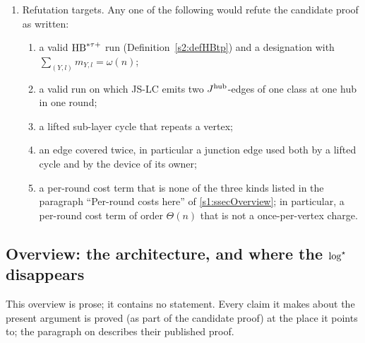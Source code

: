 \begin{remark}
\begin{enumerate}
\item[(v)] Refutation targets. Any one of the following would refute the
candidate proof as written:
\begin{enumerate}
\item[(1)] a valid $\mathrm{HB}^{*\tau{+}}$ run (Definition~\ref{s2:defHBtp}) and a designation
with $\sum_{(Y,l)}m_{Y,l}=\omega(n)$;
\item[(2)] a valid run on which JS-LC emits two $J^{\mathrm{hub}}$-edges of one class at one
hub in one round;
\item[(3)] a lifted sub-layer cycle that repeats a vertex;
\item[(4)] an edge covered twice, in particular a junction edge used both by a
lifted cycle and by the device of its owner;
\item[(5)] a per-round cost term that is none of the three kinds listed in the
paragraph ``Per-round costs here'' of \ref{s1:ssecOverview}; in particular, a
per-round cost term of order $\Theta(n)$ that is not a once-per-vertex charge.
\end{enumerate}
\end{enumerate}
\end{remark}

\subsection*{Overview: the architecture, and where the $\log^{\star}$ disappears}

This overview is prose; it contains no statement. Every claim it makes about the
present argument is proved (as part of the candidate proof) at the place it points
to; the paragraph on \cite{BM} describes their published proof.

